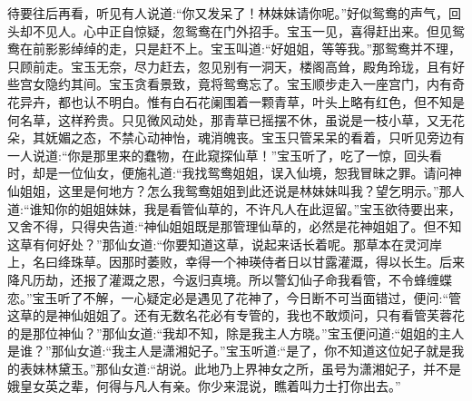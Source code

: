 \begin{parag}
    待要往后再看，听见有人说道:“你又发呆了！林妹妹请你呢。”好似鸳鸯的声气，回头却不见人。心中正自惊疑，忽鸳鸯在门外招手。宝玉一见，喜得赶出来。但见鸳鸯在前影影绰绰的走，只是赶不上。宝玉叫道:“好姐姐，等等我。”那鸳鸯并不理，只顾前走。宝玉无奈，尽力赶去，忽见别有一洞天，楼阁高耸，殿角玲珑，且有好些宫女隐约其间。宝玉贪看景致，竟将鸳鸯忘了。宝玉顺步走入一座宫门，内有奇花异卉，都也认不明白。惟有白石花阑围着一颗青草，叶头上略有红色，但不知是何名草，这样矜贵。只见微风动处，那青草已摇摆不休，虽说是一枝小草，又无花朵，其妩媚之态，不禁心动神怡，魂消魄丧。宝玉只管呆呆的看着，只听见旁边有一人说道:“你是那里来的蠢物，在此窥探仙草！”宝玉听了，吃了一惊，回头看时，却是一位仙女，便施礼道:“我找鸳鸯姐姐，误入仙境，恕我冒昧之罪。请问神仙姐姐，这里是何地方？怎么我鸳鸯姐姐到此还说是林妹妹叫我？望乞明示。”那人道:“谁知你的姐姐妹妹，我是看管仙草的，不许凡人在此逗留。”宝玉欲待要出来，又舍不得，只得央告道:“神仙姐姐既是那管理仙草的，必然是花神姐姐了。但不知这草有何好处？”那仙女道:“你要知道这草，说起来话长着呢。那草本在灵河岸上，名曰绛珠草。因那时萎败，幸得一个神瑛侍者日以甘露灌溉，得以长生。后来降凡历劫，还报了灌溉之恩，今返归真境。所以警幻仙子命我看管，不令蜂缠蝶恋。”宝玉听了不解，一心疑定必是遇见了花神了，今日断不可当面错过，便问:“管这草的是神仙姐姐了。还有无数名花必有专管的，我也不敢烦问，只有看管芙蓉花的是那位神仙？”那仙女道:“我却不知，除是我主人方晓。”宝玉便问道:“姐姐的主人是谁？”那仙女道:“我主人是潇湘妃子。”宝玉听道:“是了，你不知道这位妃子就是我的表妹林黛玉。”那仙女道:“胡说。此地乃上界神女之所，虽号为潇湘妃子，并不是娥皇女英之辈，何得与凡人有亲。你少来混说，瞧着叫力士打你出去。”
\end{parag}



